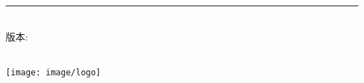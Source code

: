 %
\begin{titlepage}
	\flushright
	\hfill
	\vfill
	{\LARGE\thesisTitle} \par
	\rule[5pt]{\textwidth}{.4pt} \par
	{\Large\thesisTeam}
	\vfill
	\textit{\large\thesisDate} \\
	版本: \thesisVersion
\end{titlepage}


\begin{titlepage}
	\tgherosfont
	\centering
	
	{\Large \thesisUniversity} \\[4mm]
	\texttt{[image: image/logo]} \\[2mm]
	\textsf{\thesisUniversityInstitute} \\
	\textsf{\thesisUniversityGroup} \\
	
	\vfill
	{\large \thesisSubject} \\[5mm]
	{\LARGE \color{ctcolormain}\textbf{\thesisTitle} \\[10mm]}
	{\Large \thesisTeam} \\
	
	\vfill
    \begin{SAAuthors}
    \end{SAAuthors}
    \thesisUniversityGroup \\
	\thesisDate \\
\end{titlepage}


\hfill
\vfill
\small
\textbf{\thesisTitle} \\
\thesisSubject \\
\textbf{\thesisUniversity} \\
\thesisUniversityInstitute \\
\textit{\thesisUniversityGroup} \\
\thesisDate
